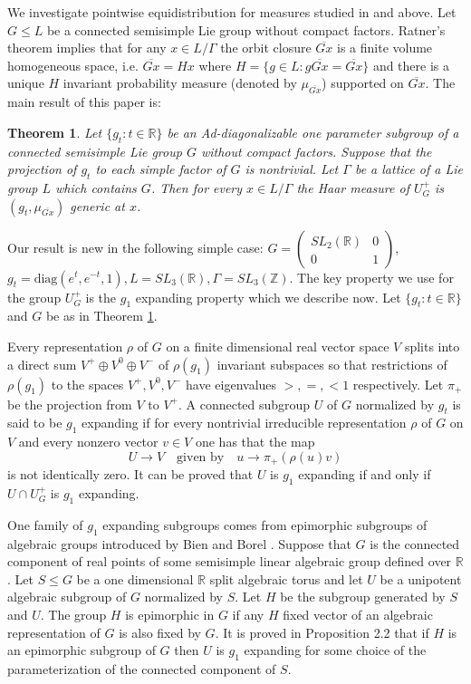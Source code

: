 \documentclass[12pt]{amsart}
\newtheorem{thm}{Theorem}[section]
\theoremstyle{definition}
\theoremstyle{remark}
\numberwithin{equation}{section}
\begin{document}
 
 
 
We investigate pointwise equidistribution for measures studied in \cite{s96} and \cite{sw96} above. 
Let $G\le L$ be a connected semisimple Lie group  without compact factors.  Ratner's theorem \cite{r912} implies that 
for any $x\in L/\Gamma$ 
the orbit closure $\overline {Gx}$ is a finite volume homogeneous space, i.e. $\overline {Gx}=Hx$
 where $H=\{g\in L: g\overline {Gx}=\overline {Gx}\}$ and there is a unique $H$ invariant 
 probability measure (denoted by $\mu_{\overline{Gx}}$) supported on $\overline {Gx}$. 
The main result of this paper is:
\begin{thm}\label{thm;1}
Let  $\{g_t :t\in \mathbb R\}$ be an  Ad-diagonalizable 
one parameter subgroup of a connected semisimple Lie group  $G$ without compact factors.
Suppose  that the projection of $g_t$ to each simple factor of $G$ is nontrivial. 
Let $\Gamma$ be a lattice of a Lie group  $L$
which contains $G$. Then for every $x\in L/\Gamma$  the  Haar measure of $U^+_G$ is 
 $(g_t, \mu_{\overline {Gx}})$ generic at $x$.
\end{thm}

Our result is new in the following simple case: $G=
\left (\begin{array}{cc}
SL_2(\mathbb R) & 0 \\
0 & 1
\end{array}
\right )$, $g_t=\mbox{diag}(e^t, e^{-t},1), 
L=SL_3(\mathbb R), \Gamma=SL_3(\mathbb Z)$.
The key property we use for the group $U_G^+$ is the $ g_1 $   expanding property which 
we describe now. 
Let $\{g_t :t\in \mathbb R\}$ and $G$ be as in Theorem \ref{thm;1}.
 
Every representation $\rho$ of $G$ on a finite dimensional real  vector space $V$ splits
into a direct sum $V^+\oplus V^0\oplus V^-$  of $\rho(g_1)$ invariant subspaces so that 
restrictions of $\rho(g_1)$ to the spaces 
 $V^+, V^0, V^-$ have eigenvalues  $>,=,<1$ respectively. Let   $\pi_+$  be the projection from $V$ to $V^+$. 
A connected subgroup $U$ of $G$ normalized by $g_t$ is said to be  $ g_1 $ expanding if
 for every nontrivial
irreducible  representation $\rho$ of $G$ on $V$ and every nonzero vector $v\in V$ one has that the map 
\[
 U\to V \quad \mbox{given by}\quad  u\to  \pi_+(\rho(u)v)
\]
is not identically zero. 
It can be proved that    $U$ is $g_1$ expanding if and only if 
$U\cap U_G^+$ is $g_1$ expanding.

One family of $ g_1  $ expanding subgroups comes from epimorphic subgroups of algebraic groups
introduced by  Bien and Borel \cite{bb}.
Suppose that $G$ is the connected component of real points of some
 semisimple linear algebraic group defined over $\mathbb R$.
Let  $S\le G$ be a one dimensional $\mathbb R$ split algebraic torus and let $U$ be a unipotent algebraic 
subgroup of $G$ normalized by $S$.  
Let   $H$  be the subgroup  generated by $S$  and $U$.
The group $H$ is  epimorphic in $G$ if 
any $H$ fixed  vector of 
 an   algebraic  representation of $G$
   is also  fixed by $G$. 
 It is proved in  \cite{sw96} Proposition 2.2 that if $H$ is an epimorphic subgroup of $G$ then $U$ is  $ g_1 $ expanding for some choice of the parameterization of the connected component of $S$.
 
\end{document}
